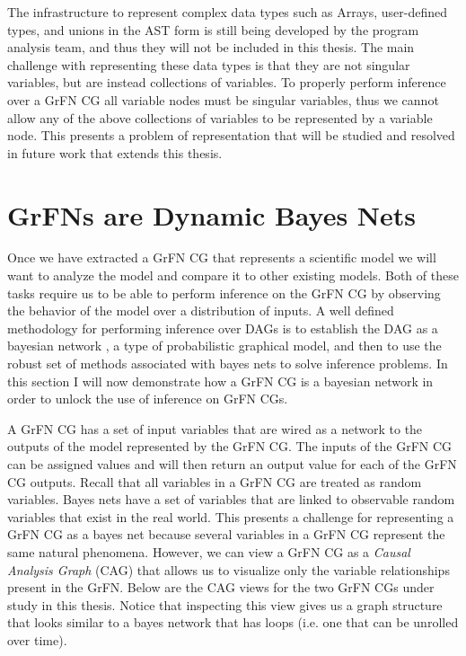 The infrastructure to represent complex data types such as Arrays, user-defined types, and unions in the AST form is still being developed by the program analysis team, and thus they will not be included in this thesis. The main challenge with representing these data types is that they are not singular variables, but are instead collections of variables. To properly perform inference over a GrFN CG all variable nodes must be singular variables, thus we cannot allow any of the above collections of variables to be represented by a variable node. This presents a problem of representation that will be studied  and resolved in future work that extends this thesis.

\section{GrFNs are Dynamic Bayes Nets\label{sec:grfn_as_dbn}}
Once we have extracted a GrFN CG that represents a scientific model we will want to analyze the model and compare it to other existing models.
Both of these tasks require us to be able to perform inference on the GrFN CG by observing the behavior of the model over a distribution of inputs.
A well defined methodology for performing inference over DAGs is to establish the DAG as a bayesian network \citep{bishop2006pattern}, a type of probabilistic graphical model, and then to use the robust set of methods associated with bayes nets to solve inference problems.
In this section I will now demonstrate how a GrFN CG is a bayesian network in order to unlock the use of inference on GrFN CGs.

A GrFN CG has a set of input variables that are wired as a network to the outputs of the model represented by the GrFN CG.
The inputs of the GrFN CG can be assigned values and will then return an output value for each of the GrFN CG outputs.
Recall that all variables in a GrFN CG are treated as random variables.
Bayes nets have a set of variables that are linked to observable random variables that exist in the real world.
This presents a challenge for representing a GrFN CG as a bayes net because several variables in a GrFN CG represent the same natural phenomena.
However, we can view a GrFN CG as a \emph{Causal Analysis Graph} (CAG) that allows us to visualize only the variable relationships present in the GrFN.
Below are the CAG views for the two GrFN CGs under study in this thesis. Notice that inspecting this view gives us a graph structure that looks similar to a bayes network that has loops (i.e. one that can be unrolled over time).

